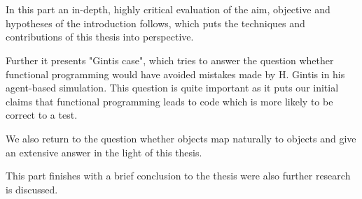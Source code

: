 \chapter*{}
\label{ch:discussion}

In this part an in-depth, highly critical evaluation of the aim, objective and hypotheses of the introduction follows, which puts the techniques and contributions of this thesis into perspective.

Further it presents "Gintis case", which tries to answer the question whether functional programming would have avoided mistakes made by H. Gintis in his agent-based simulation. This question is quite important as it puts our initial claims that functional programming leads to code which is more likely to be correct to a test. 

We also return to the question whether objects map naturally to objects and give an extensive answer in the light of this thesis.

This part finishes with a brief conclusion to the thesis were also further research is discussed.





